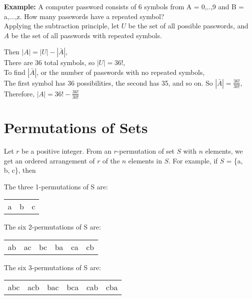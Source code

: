 \documentclass[12pt, letterpaper]{article}
\begin{document}
\textbf{Example:} A computer password consists of 6 symbols from A = {0,..,9} and B = {a,...,z}. How many passwords have a repeated symbol? \\

\noindent Applying the subtraction principle, let \(U\) be the set of all possible passwords, and \(A\) be the set of all passwords with repeated symbols. \\

\begin{center}
  Then \(|A| = |U| - |\bar{A}|\), \\
  There are 36 total symbols, so \(|U| = 36!\), \\
  To find \(|\bar{A}|\), or the number of passwords with no repeated symbols, \\
  The first symbol has 36 possibilities, the second has 35, and so on. So \(|\bar{A}| = \frac{36!}{30!}\), \\
  Therefore, \(|A| = 36! - \frac{36!}{30!}\) \\
\end{center}

\pagebreak
\section*{Permutations of Sets}
Let \(r\) be a positive integer. From an \(r\)-permutation of set \(S\) with \(n\) elements, we get an ordered arrangement of \(r\) of the \(n\) elements in \(S\). For example, if \(S\) = \{a, b, c\}, then 

\begin{center}
  The three 1-permutations of S are: \\
  \begin{tabular}{c c c}
    a & b & c \\
  \end{tabular}

  The six 2-permutations of S are: \\
  \begin{tabular}{c c c c c c}
    ab & ac & bc & ba & ca & cb \\
  \end{tabular}

  The six 3-permutations of S are: \\
  \begin{tabular}{c c c c c c}
    abc & acb & bac & bca & cab & cba \\
  \end{tabular}
\end{center} 
\end{document}

